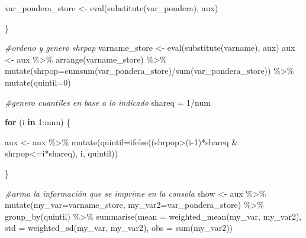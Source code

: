 \documentclass[
]{book}
\newenvironment{Shaded}{\begin{snugshade}}{\end{snugshade}}
\newcommand{\AttributeTok}[1]{\textcolor[rgb]{0.77,0.63,0.00}{#1}}
\newcommand{\CommentTok}[1]{\textcolor[rgb]{0.56,0.35,0.01}{\textit{#1}}}
\newcommand{\ControlFlowTok}[1]{\textcolor[rgb]{0.13,0.29,0.53}{\textbf{#1}}}
\newcommand{\DecValTok}[1]{\textcolor[rgb]{0.00,0.00,0.81}{#1}}
\newcommand{\FunctionTok}[1]{\textcolor[rgb]{0.00,0.00,0.00}{#1}}
\newcommand{\NormalTok}[1]{#1}
\newcommand{\OtherTok}[1]{\textcolor[rgb]{0.56,0.35,0.01}{#1}}
\newcommand{\SpecialCharTok}[1]{\textcolor[rgb]{0.00,0.00,0.00}{#1}}
\begin{document}
\begin{Shaded}
\begin{Highlighting}[numbers=left,,]
\NormalTok{    var\_pondera\_store }\OtherTok{\textless{}{-}} \FunctionTok{eval}\NormalTok{(}\FunctionTok{substitute}\NormalTok{(var\_pondera), aux)}
    
\NormalTok{  \}}
  
  
  
  \CommentTok{\#ordeno y genero shrpop}
\NormalTok{  varname\_store }\OtherTok{\textless{}{-}} \FunctionTok{eval}\NormalTok{(}\FunctionTok{substitute}\NormalTok{(varname), aux)}
\NormalTok{  aux }\OtherTok{\textless{}{-}}\NormalTok{ aux }\SpecialCharTok{\%\textgreater{}\%} \FunctionTok{arrange}\NormalTok{(varname\_store) }\SpecialCharTok{\%\textgreater{}\%} 
    \FunctionTok{mutate}\NormalTok{(}\AttributeTok{shrpop=}\FunctionTok{cumsum}\NormalTok{(var\_pondera\_store)}\SpecialCharTok{/}\FunctionTok{sum}\NormalTok{(var\_pondera\_store)) }\SpecialCharTok{\%\textgreater{}\%}
    \FunctionTok{mutate}\NormalTok{(}\AttributeTok{quintil=}\DecValTok{0}\NormalTok{)}
  
  \CommentTok{\#genero cuantiles en base a lo indicado}
\NormalTok{  shareq }\OtherTok{=} \DecValTok{1}\SpecialCharTok{/}\NormalTok{num}
  
  \ControlFlowTok{for}\NormalTok{ (i }\ControlFlowTok{in} \DecValTok{1}\SpecialCharTok{:}\NormalTok{num) \{}
    
\NormalTok{    aux }\OtherTok{\textless{}{-}}\NormalTok{ aux }\SpecialCharTok{\%\textgreater{}\%} \FunctionTok{mutate}\NormalTok{(}\AttributeTok{quintil=}\FunctionTok{ifelse}\NormalTok{((shrpop}\SpecialCharTok{\textgreater{}}\NormalTok{(i}\DecValTok{{-}1}\NormalTok{)}\SpecialCharTok{*}\NormalTok{shareq }\SpecialCharTok{\&}\NormalTok{ shrpop}\SpecialCharTok{\textless{}=}\NormalTok{i}\SpecialCharTok{*}\NormalTok{shareq), i, quintil))}
    
\NormalTok{  \}}
  
  
  \CommentTok{\#armo la información que se imprime en la consola}
\NormalTok{  show }\OtherTok{\textless{}{-}}\NormalTok{ aux }\SpecialCharTok{\%\textgreater{}\%} \FunctionTok{mutate}\NormalTok{(}\AttributeTok{my\_var=}\NormalTok{varname\_store,}
                         \AttributeTok{my\_var2=}\NormalTok{var\_pondera\_store) }\SpecialCharTok{\%\textgreater{}\%} \FunctionTok{group\_by}\NormalTok{(quintil) }\SpecialCharTok{\%\textgreater{}\%}
                  \FunctionTok{summarise}\NormalTok{(}\AttributeTok{mean =} \FunctionTok{weighted\_mean}\NormalTok{(my\_var, my\_var2),}
                             \AttributeTok{std =} \FunctionTok{weighted\_sd}\NormalTok{(my\_var, my\_var2),}
                             \AttributeTok{obs =} \FunctionTok{sum}\NormalTok{(my\_var2))}
  

\end{Highlighting}
\end{Shaded}
\end{document}
